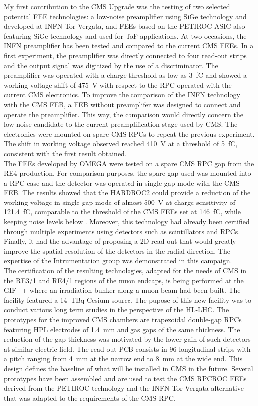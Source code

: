 	My first contribution to the CMS Upgrade was the testing of two selected potential FEE technologies: a low-noise preamplifier using SiGe technology and developed at INFN Tor Vergata, and FEEs based on the PETIROC ASIC also featuring SiGe technology and used for \acl{ToF} applications. At two occasions, the INFN preamplifier has been tested and compared to the current CMS FEEs. In a first experiment, the preamplifier was directly connected to four read-out strips and the output signal was digitized by the use of a discriminator. The preamplifier was operated with a charge threshold as low as \SI{3}{fC} and showed a working voltage shift of \SI{475}{V} with respect to the RPC operated with the current CMS electronics. To improve the comparison of the INFN technology with the CMS FEB, a FEB without preamplifer was designed to connect and operate the preamplifier. This way, the comparison would directly concern the low-noise candidate to the current preamplification stage used by CMS. The electronics were mounted on spare CMS RPCs to repeat the previous experiment. The shift in working voltage observed reached \SI{410}{V} at a threshold of \SI{5}{fC}, consistent with the first result obtained.\\
	The FEEs developed by OMEGA were tested on a spare CMS RPC gap from the RE4 production. For comparison purposes, the spare gap used was mounted into a RPC case and the detector was operated in single gap mode with the CMS FEB. The results showed that the HARDROC2 could provide a reduction of the working voltage in single gap mode of almost \SI{500}{V} at charge sensitivity of \SI{121.4}{fC}, comparable to the threshold of the CMS FEEs set at \SI{146}{fC}, while keeping noise levels below . Moreover, this technology had already been certified through multiple experiments using detectors such as scintillators and RPCs. Finally, it had the advantage of proposing a 2D read-out that would greatly improve the spatial resolution of the detectors in the radial direction. The expertise of the Intrumentation group was demonstrated in this campaign.\\
	The certification of the resulting technologies, adapted for the needs of CMS in the RE3/1 and RE4/1 regions of the muon endcaps, is being performed at the \acf{GIF++} where an irradiation bunker along a muon beam had been built. The facility featured a \SI{14}{TBq} Cesium source. The pupose of this new facility was to conduct various long term studies in the perspective of the HL-LHC. The prototypes for the improved CMS chambers are trapezoidal double-gap RPCs featuring \acf{HPL} electrodes of \SI{1.4}{mm} and gas gaps of the same thickness. The reduction of the gap thickness was motivated by the lower gain of such detectors at similar electric field. The read-out PCB consists in 96 longitudinal strips with a pitch ranging from \SI{4}{mm} at the narrow end to \SI{8}{mm} at the wide end. This design defines the baseline of what will be installed in CMS in the future. Several prototypes have been assembled and are used to test the CMS RPCROC FEEs derived from the PETIROC technology and the INFN Tor Vergata alternative that was adapted to the requirements of the CMS RPC.\\
